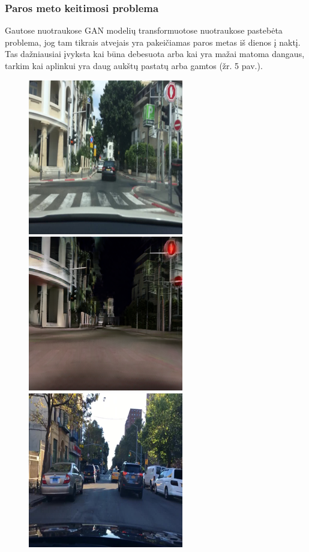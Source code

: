 \documentclass{VUMIFPSbakalaurinis}
\begin{document}
        \subsubsection{Paros meto keitimosi problema}
                Gautose nuotraukose GAN modelių transformuotose nuotraukose pastebėta problema, jog tam tikrais atvejais yra pakeičiamas paros metas iš dienos į naktį. Tas dažniausiai įvyksta kai būna debesuota arba kai yra mažai matoma dangaus, tarkim kai aplinkui yra daug aukštų pastatų arba gamtos (žr. 5 pav.).
                \begin{figure}[H]
                    \centering
                    \includegraphics[scale=0.7]{img/aukstu_pastatu_real}
                    \includegraphics[scale=0.7]{img/aukstu_pastatu_fake}
                    \includegraphics[scale=0.7]{img/debesu_real}

\end{figure}
\end{document}
